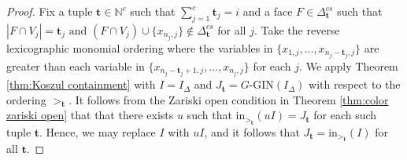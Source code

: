 \documentclass[a4paper, 10pt, reqno, english, ones]{amsart}  %
\theoremstyle{definition}
\theoremstyle{remark}
\begin{document}
\bettiLowBound*
\begin{proof}
    Fix a tuple $\mathbf{t}\in \mathbb{N}^c$ such that $\sum_{j=1}^c\mathbf{t}_j=i$ and a face $F\in \Delta_{\mathbf{t}}^{cs}$ such that $|F\cap V_j| = \mathbf{t}_j \textrm{ and } (F\cap V_j)\cup \{x_{n_j,j}\}\notin \Delta_{\mathbf{t}}^{cs}$ for all $j$. Take the reverse lexicographic monomial ordering where the variables in $\{x_{1,j},\dots,x_{n_j-\mathbf{t}_j,j} \}$ are greater than each variable in $\{x_{n_j-\mathbf{t}_j+1,j},\dots,x_{n_j,j} \}$ for each $j$. We apply Theorem \ref{thm:Koszul containment} with $I=I_\Delta$ and $J_{\mathbf{t}}=G\textrm{-GIN}(I_\Delta)$ with respect to the ordering $>_{\mathbf{t}}$. It follows from the Zariski open condition in Theorem \ref{thm:color zariski open} that that there exists $u$ such that $\textrm{in}_{>_\mathbf{t}}(uI) = J_{\mathbf{t}}$ for each such tuple $\mathbf{t}$. Hence, we may replace $I$ with $uI$, and it follows that $J_{\mathbf{t}} = \textrm{in}_{>_{\mathbf{t}}}(I)$ for all $\mathbf{t}$. 
    

\end{proof}
\end{document}
